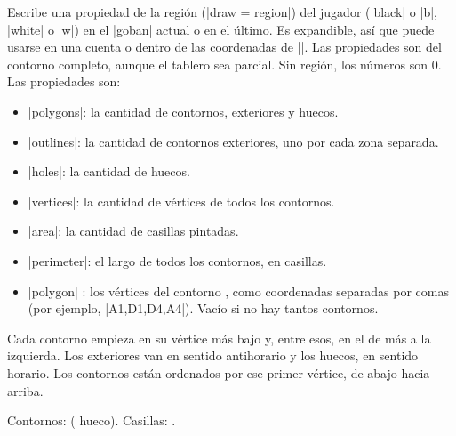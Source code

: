 	\begin{command}{\pgfgoregion{}}
		Escribe una propiedad de la región (|draw = region|) del jugador (|black| o |b|, |white| o |w|) en el |goban| actual o en el último. Es expandible, así que puede usarse en una cuenta o dentro de las coordenadas de |\marks|. Las propiedades son del contorno completo, aunque el tablero sea parcial. Sin región, los números son 0. Las propiedades son:
		\begin{itemize}
			\item |polygons|: la cantidad de contornos, exteriores y huecos.
			\item |outlines|: la cantidad de contornos exteriores, uno por cada zona separada.
			\item |holes|: la cantidad de huecos.
			\item |vertices|: la cantidad de vértices de todos los contornos.
			\item |area|: la cantidad de casillas pintadas.
			\item |perimeter|: el largo de todos los contornos, en casillas.
			\item |polygon| : los vértices del contorno , como coordenadas separadas por comas (por ejemplo, |A1,D1,D4,A4|). Vacío si no hay tantos contornos.
		\end{itemize}
		Cada contorno empieza en su vértice más bajo y, entre esos, en el de más a la izquierda. Los exteriores van en sentido antihorario y los huecos, en sentido horario. Los contornos están ordenados por ese primer vértice, de abajo hacia arriba.

		\begin{codeexample}[width=4.75cm]
			\begin{goban}[label = {at = {above, left}}]
			\end{goban}

			Contornos: 
			( hueco).
			Casillas: .
		\end{codeexample}
	\end{command}
